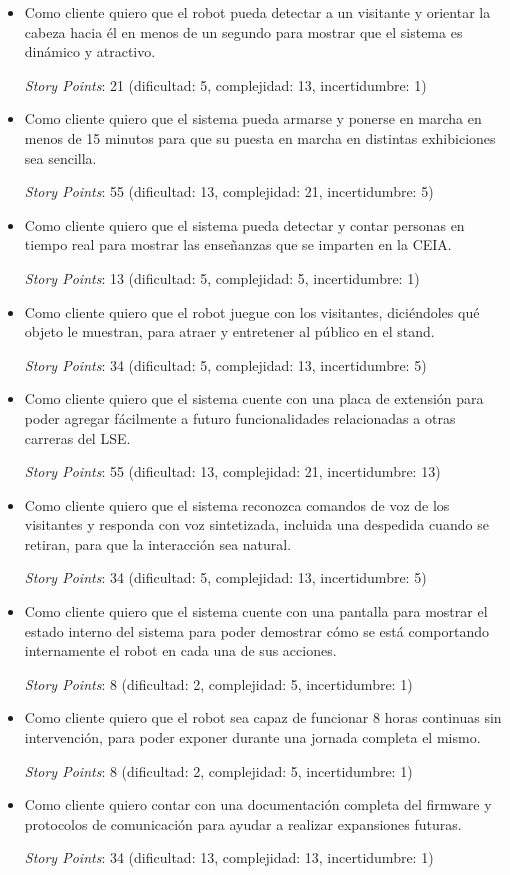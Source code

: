 \documentclass[
11pt, %
]{charter}
\begin{document}
\begin{itemize}
	\item Como cliente quiero que el robot pueda detectar a un visitante y orientar la cabeza hacia él en menos de un segundo para mostrar que el sistema es dinámico y atractivo.

	\textit{Story Points}: 21 (dificultad: 5, complejidad: 13, incertidumbre: 1)
	\item Como cliente quiero que el sistema pueda armarse y ponerse en marcha en menos de 15 minutos para que su puesta en marcha en distintas exhibiciones sea sencilla.

	\textit{Story Points}: 55 (dificultad: 13, complejidad: 21, incertidumbre: 5)
	\item Como cliente quiero que el sistema pueda detectar y contar personas en tiempo real para mostrar las enseñanzas que se imparten en la CEIA.

	\textit{Story Points}: 13 (dificultad: 5, complejidad: 5, incertidumbre: 1)
	\item Como cliente quiero que el robot juegue con los visitantes, diciéndoles qué objeto le muestran, para atraer y entretener al público en el stand.

	\textit{Story Points}: 34 (dificultad: 5, complejidad: 13, incertidumbre: 5)
	\item Como cliente quiero que el sistema cuente con una placa de extensión para poder agregar fácilmente a futuro funcionalidades relacionadas a otras carreras del LSE.

	\textit{Story Points}: 55 (dificultad: 13, complejidad: 21, incertidumbre: 13)
	\item Como cliente quiero que el sistema reconozca comandos de voz de los visitantes y responda con voz sintetizada, incluida una despedida cuando se retiran, para que la interacción sea natural.

	\textit{Story Points}: 34 (dificultad: 5, complejidad: 13, incertidumbre: 5)
	\item Como cliente quiero que el sistema cuente con una pantalla para mostrar el estado interno del sistema para poder demostrar cómo se está comportando internamente el robot en cada una de sus acciones.

	\textit{Story Points}: 8 (dificultad: 2, complejidad: 5, incertidumbre: 1)
	\item Como cliente quiero que el robot sea capaz de funcionar 8 horas continuas sin intervención, para poder exponer durante una jornada completa el mismo.

	\textit{Story Points}: 8 (dificultad: 2, complejidad: 5, incertidumbre: 1)
	\item Como cliente quiero contar con una documentación completa del firmware y protocolos de comunicación para ayudar a realizar expansiones futuras.

	\textit{Story Points}: 34 (dificultad: 13, complejidad: 13, incertidumbre: 1)
\end{itemize}
\end{document}
